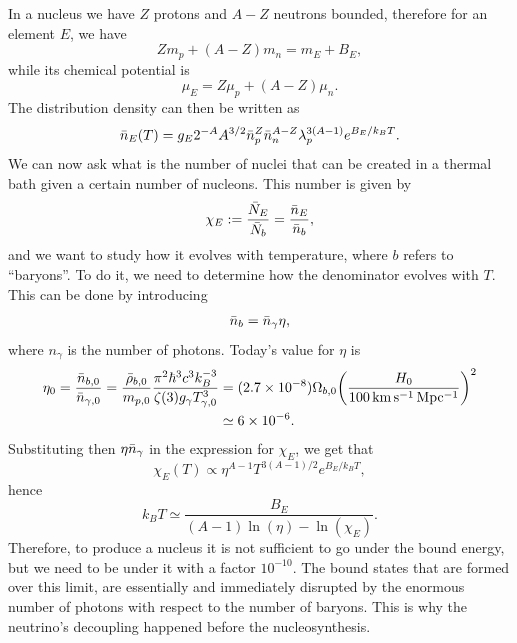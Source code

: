 In a nucleus we have $Z$ protons and $A - Z$ neutrons bounded, therefore for an element $E$, we have 
\begin{equation}
    Zm_p + (A - Z)m_n = m_E + B_E,
\end{equation}
while its chemical potential is 
\begin{equation}
    \mu_E = Z\mu_p + (A - Z)\mu_n.
\end{equation}
The distribution density can then be written as 
\begin{equation}
    \bar{n}_E(T) = g_E2^{-A}A^{3/2}\bar{n}_p^{Z}\bar{n}_n^{A - Z}\lambda_p^{3(A - 1)}e^{B_E/k_BT}.
\end{equation}
We can now ask what is the number of nuclei that can be created in a thermal bath given a certain number of nucleons. This number is given by 
\begin{equation}
    \chi_E := \frac{\bar{N}_E}{\bar{N}_b} = \frac{\bar{n}_E}{\bar{n}_b},
\end{equation}
and we want to study how it evolves with temperature, where $b$ refers to ``baryons''. To do it, we need to determine how the denominator evolves with $T$. This can be done by introducing 
\begin{eqnarray}
    \bar{n}_b = \bar{n}_\gamma \eta,
\end{eqnarray}
where $n_\gamma$ is the number of photons. Today's value for $\eta$ is 
\begin{equation}
    \begin{split}
        \eta_0 = \frac{\bar{n}_{b,0}}{\bar{n}_{\gamma,0}} = \frac{\bar{\rho}_{b,0}}{m_{p,0}}\frac{\pi^2\hbar^3c^3k_B^{-3}}{\zeta(3)g_\gamma T^3_{\gamma,0}} &= (2.7 \times 10^{-8}) \Omega_{b,0}\bigg(\frac{H_0}{100\,\mathrm{km\,s^{-1}\,Mpc^{-1}}}\bigg)^2 \\
        &\simeq 6 \times 10^{-6}.
    \end{split}
\end{equation}
Substituting then $\eta \bar{n}_\gamma$ in the expression for $\chi_E$, we get that 
\begin{equation}
    \chi_E(T) \propto \eta^{A - 1}T^{3(A - 1)/2}e^{B_E/k_BT}, 
\end{equation}
hence 
\begin{equation}
    k_BT \simeq \frac{B_E}{(A - 1)\ln{(\eta)} - \ln{(\chi_E)}}.
\end{equation}
Therefore, to produce a nucleus it is not sufficient to go under the bound energy, but we need to be under it with a factor $10^{-10}$. The bound states that are formed over this limit, are essentially and immediately disrupted by the enormous number of photons with respect to the number of baryons. This is why the neutrino's decoupling happened before the nucleosynthesis.

